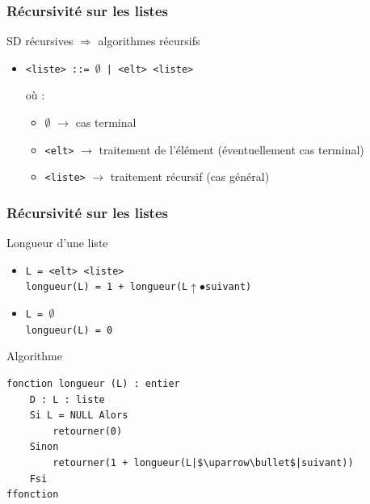\documentclass[table,handout,tikz,12pt,svgnames]{beamer}
\begin{document}
\begin{frame}[fragile=singleslide]
	\frametitle{Récursivité sur les listes}
	\begin{block}{SD récursives $\Rightarrow$ algorithmes récursifs} %
		\begin{itemize}
			\item \texttt{<liste> ::= $\emptyset$	|	<elt> <liste>} \\
			\vspace{0.5cm}

			où :
			\begin{itemize}
			\item $\emptyset$ $\rightarrow$ cas terminal
			\item \texttt{<elt>} $\rightarrow$ traitement de l'élément (éventuellement cas terminal)
			\item \texttt{<liste>} $\rightarrow$ traitement récursif (cas général)
			\end{itemize}
		\end{itemize}
	\end{block}
\end{frame}

\begin{frame}[fragile=singleslide]
	\frametitle{Récursivité sur les listes}
	\begin{block}{Longueur d'une liste} %
		\begin{itemize}
			\item \texttt{L = <elt> <liste>} \\ \texttt{longueur(L) = 1 + longueur(L$\uparrow\bullet$suivant)}
			\item \texttt{L = $\emptyset$} \\ \texttt{longueur(L) = 0}
		\end{itemize}
	\end{block}
	\begin{block}{Algorithme} %
		\begin{verbatim}
fonction longueur (L) : entier
	D : L : liste
	Si L = NULL Alors
		retourner(0)
	Sinon
		retourner(1 + longueur(L|$\uparrow\bullet$|suivant))
	Fsi
ffonction
		\end{verbatim}
	\end{block}
\end{frame}
\end{document}
